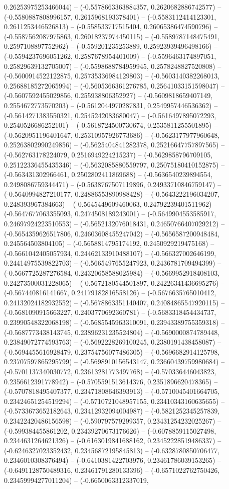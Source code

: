 0.26253975253466044) -- (-0.5578663363884357, 0.2620682886742577) -- (-0.5580887808996157, 0.2615968193378401) -- (-0.5583112414123301, 0.2611253446526813) -- (-0.558533717515404, 0.26065386474590796) -- (-0.5587562087975863, 0.26018237974450115) -- (-0.5589787148475491, 0.2597108897752962) -- (-0.559201235253889, 0.25923939496498166) -- (-0.5594237696051262, 0.2587678954401009) -- (-0.5596463174897051, 0.25829639132705007) -- (-0.5598688784959945, 0.2578248827520808) -- (-0.5600914522122875, 0.25735336984129803) -- (-0.5603140382268013, 0.25688185272065994) -- (-0.5605366361276785, 0.25641033151598047) -- (-0.5607592455029856, 0.255938806352927) -- (-0.5609818659407149, 0.2554672773570203) -- (-0.5612044970287831, 0.2549957446536362) -- (-0.5614271383550321, 0.2545242083680047) -- (-0.5616497895072293, 0.2540526686252101) -- (-0.5618724500730674, 0.2535811255501895) -- (-0.5620951196401647, 0.25310957926773686) -- (-0.5623177977960648, 0.25263802990249856) -- (-0.5625404841282378, 0.25216647757897565) -- (-0.562763178224079, 0.2516949224215237) -- (-0.5629858796709105, 0.25122336455435346) -- (-0.5632085880559797, 0.25075180410152875) -- (-0.563431302966461, 0.2502802411869688) -- (-0.5636540239894554, 0.2498086759344471) -- (-0.5638767507119896, 0.24933710846759147) -- (-0.5640994827210177, 0.24886553890988428) -- (-0.5643222196034207, 0.248393967384663) -- (-0.5645449609460063, 0.24792239401511962) -- (-0.5647677063355093, 0.2474508189243001) -- (-0.5649904553585917, 0.24697924223510553) -- (-0.5652132076018431, 0.24650766407029212) -- (-0.5654359626517806, 0.24603608455247042) -- (-0.5656587200948484, 0.245564503804105) -- (-0.5658814795174192, 0.2450929219475168) -- (-0.5661042405057934, 0.24462133910488107) -- (-0.566327002646199, 0.24414975539822703) -- (-0.5665497655247923, 0.2436781709494399) -- (-0.5667725287276584, 0.24320658588025984) -- (-0.5669952918408103, 0.24273500031228065) -- (-0.5672180544501897, 0.24226341436695276) -- (-0.567440816141667, 0.24179182816558126) -- (-0.5676635765010412, 0.24132024182932552) -- (-0.5678863351140407, 0.24084865547920115) -- (-0.5681090915663227, 0.2403770692360781) -- (-0.5683318454434737, 0.23990548322068198) -- (-0.5685545963310091, 0.23943389755359318) -- (-0.5687773438143745, 0.23896231235524804) -- (-0.5690000874789448, 0.23849072774593763) -- (-0.5692228269100245, 0.2380191438458087) -- (-0.5694455616928479, 0.23754756077486305) -- (-0.5696682914125798, 0.23707597865295799) -- (-0.5698910156543147, 0.23660439759980684) -- (-0.5701137340030772, 0.23613281773497768) -- (-0.570336446043823, 0.2356612391778942) -- (-0.5705591513614376, 0.2351896620478365) -- (-0.5707818495407377, 0.23471808646393913) -- (-0.5710045401664705, 0.23424651254519294) -- (-0.5710721048957155, 0.23410343160635655) -- (-0.5733673652182643, 0.23412932094004987) -- (-0.5821252345257839, 0.23422420486156598) -- (-0.590797579299357, 0.23431254232025267) -- (-0.599384455861202, 0.23439270673176626) -- (-0.6078859115027498, 0.2344631264621326) -- (-0.6163019841688162, 0.23452228519486337) -- (-0.6246327023352432, 0.23456872195845813) -- (-0.6328780850706477, 0.2346010308376494) -- (-0.6410381422703976, 0.23461786039153265) -- (-0.6491128750489316, 0.23461791280133396) -- (-0.6571022762750426, 0.23459994277011204) -- (-0.6650063312337019, 